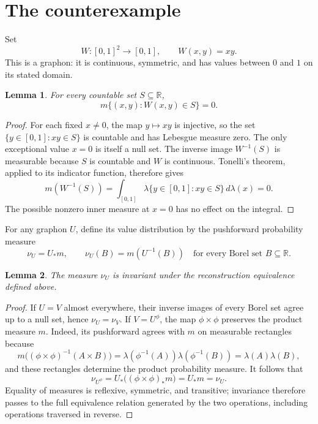 \documentclass[11pt]{article}
\newtheorem{lemma}{Lemma}
\newcommand{\R}{\mathbb R}
\begin{document}
\section{The counterexample}
Set
\[
 W:[0,1]^2\longrightarrow[0,1],\qquad W(x,y)=xy.
\]
This is a graphon: it is continuous, symmetric, and has values between
$0$ and $1$ on its stated domain.

\begin{lemma}\label{lem:countable}
For every countable set $S\subseteq\R$,
\[
 m\{(x,y): W(x,y)\in S\}=0.
\]
\end{lemma}
\begin{proof}
For each fixed $x\ne0$, the map $y\mapsto xy$ is injective, so the set
$\{y\in[0,1]:xy\in S\}$ is countable and has Lebesgue measure zero.
The only exceptional value $x=0$ is itself a null set. The inverse image
$W^{-1}(S)$ is measurable because $S$ is countable and $W$ is continuous.
Tonelli's theorem, applied to its indicator function, therefore gives
\[
 m(W^{-1}(S))
 =\int_{[0,1]}\lambda\{y\in[0,1]:xy\in S\}\,d\lambda(x)=0.
\]
The possible nonzero inner measure at $x=0$ has no effect on the integral.
\end{proof}

For any graphon $U$, define its value distribution by the pushforward
probability measure
\[
 \nu_U=U_*m,\qquad \nu_U(B)=m(U^{-1}(B))
 \quad\text{for every Borel set }B\subseteq\R.
\]

\begin{lemma}\label{lem:invariant}
The measure $\nu_U$ is invariant under the reconstruction equivalence
defined above.
\end{lemma}
\begin{proof}
If $U=V$ almost everywhere, their inverse images of every Borel set agree
up to a null set, hence $\nu_U=\nu_V$. If $V=U^\phi$, the map
$\phi\times\phi$ preserves the product measure $m$. Indeed, its pushforward
agrees with $m$ on measurable rectangles because
\[
 m\bigl((\phi\times\phi)^{-1}(A\times B)\bigr)
 =\lambda(\phi^{-1}(A))\lambda(\phi^{-1}(B))
 =\lambda(A)\lambda(B),
\]
and these rectangles determine the product probability measure. It follows
that
\[
 \nu_{U^\phi}=U_*\bigl((\phi\times\phi)_*m\bigr)=U_*m=\nu_U.
\]
Equality of measures is reflexive, symmetric, and transitive; invariance
therefore passes to the full equivalence relation generated by the two
operations, including operations traversed in reverse.
\end{proof}
\end{document}
